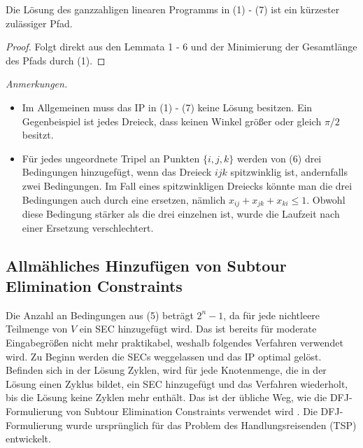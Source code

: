 \documentclass[a4paper, 10pt, ngerman]{article}
\begin{document}
\begin{theorem}
    Die Lösung des ganzzahligen linearen Programms in (1) - (7) ist ein kürzester zulässiger Pfad. 
\end{theorem}

\begin{proof}
    Folgt direkt aus den Lemmata 1 - 6 und der Minimierung der Gesamtlänge des Pfads durch (1).
\end{proof}

\emph{Anmerkungen.} 
\begin{itemize}
    \item Im Allgemeinen muss das IP in (1) - (7) keine Lösung besitzen. Ein Gegenbeispiel ist jedes Dreieck, dass keinen Winkel größer oder gleich $\pi / 2$ besitzt.
    \item Für jedes ungeordnete Tripel an Punkten $\{i, j, k\}$ werden von (6) drei Bedingungen hinzugefügt, wenn das Dreieck $ijk$ spitzwinklig ist, andernfalls zwei Bedingungen. Im Fall eines spitzwinkligen Dreiecks könnte man die drei Bedingungen auch durch eine ersetzen, nämlich $x_{ij} + x_{jk} + x_{ki} \le 1$. Obwohl diese Bedingung stärker als die drei einzelnen ist, wurde die Laufzeit nach einer Ersetzung verschlechtert.
\end{itemize} 

\subsection{Allmähliches Hinzufügen von Subtour Elimination Constraints}

Die Anzahl an Bedingungen aus (5) beträgt $2^n - 1$, da für jede nichtleere Teilmenge von $V$ ein SEC hinzugefügt wird. Das ist bereits für moderate Eingabegrößen nicht mehr praktikabel, weshalb folgendes Verfahren verwendet wird. Zu Beginn werden die SECs weggelassen und das IP optimal gelöst. Befinden sich in der Lösung Zyklen, wird für jede Knotenmenge, die in der Lösung einen Zyklus bildet, ein SEC hinzugefügt und das Verfahren wiederholt, bis die Lösung keine Zyklen mehr enthält. Das ist der übliche Weg, wie die DFJ-Formulierung von Subtour Elimination Constraints verwendet wird \cite{tsp-formulations}. Die DFJ-Formulierung wurde ursprünglich für das Problem des Handlungsreisenden (TSP) entwickelt.
\end{document}
